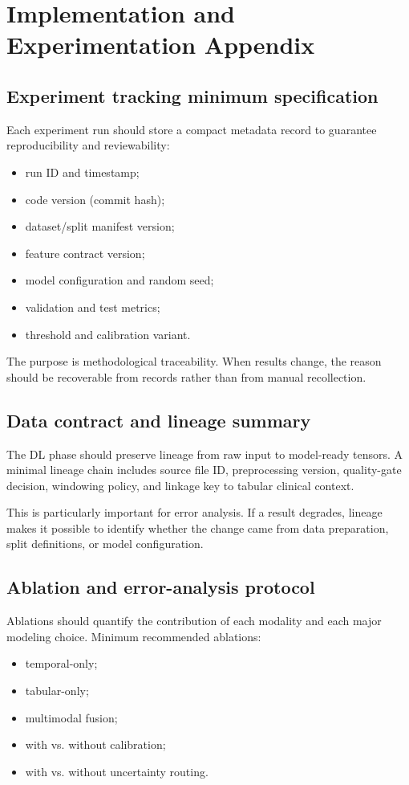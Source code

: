 \chapter{Implementation and Experimentation Appendix}

\section{Experiment tracking minimum specification}
Each experiment run should store a compact metadata record to guarantee reproducibility and reviewability:
\begin{itemize}[leftmargin=1.2cm]
    \item run ID and timestamp;
    \item code version (commit hash);
    \item dataset/split manifest version;
    \item feature contract version;
    \item model configuration and random seed;
    \item validation and test metrics;
    \item threshold and calibration variant.
\end{itemize}

The purpose is methodological traceability. When results change, the reason should be recoverable from records rather than from manual recollection.

\section{Data contract and lineage summary}
The DL phase should preserve lineage from raw input to model-ready tensors. A minimal lineage chain includes source file ID, preprocessing version, quality-gate decision, windowing policy, and linkage key to tabular clinical context.

This is particularly important for error analysis. If a result degrades, lineage makes it possible to identify whether the change came from data preparation, split definitions, or model configuration.

\section{Ablation and error-analysis protocol}
Ablations should quantify the contribution of each modality and each major modeling choice. Minimum recommended ablations:
\begin{itemize}[leftmargin=1.2cm]
    \item temporal-only;
    \item tabular-only;
    \item multimodal fusion;
    \item with vs. without calibration;
    \item with vs. without uncertainty routing.
\end{itemize}

